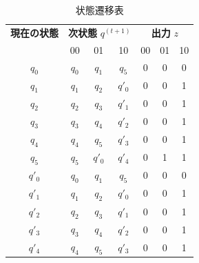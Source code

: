 \documentclass{article}
\begin{document}
\begin{table}[h]
\centering
\setlength{\tabcolsep}{6pt}
\renewcommand{\arraystretch}{1.2}
\begin{tabular}{c|ccc|ccc}
\toprule
\textbf{現在の状態} & \multicolumn{3}{c|}{\textbf{次状態 } $q^{(t+1)}$} & \multicolumn{3}{c}{\textbf{出力 } $z$} \\
 & 00 & 01 & 10 & 00 & 01 & 10 \\
\midrule
$q_0$ & $q_0$ & $q_1$ & $q_5$ & 0 & 0 & 0 \\
$q_1$ & $q_1$ & $q_2$ & $q'_0$ & 0 & 0 & 1 \\
$q_2$ & $q_2$ & $q_3$ & $q'_1$ & 0 & 0 & 1 \\
$q_3$ & $q_3$ & $q_4$ & $q'_2$ & 0 & 0 & 1 \\
$q_4$ & $q_4$ & $q_5$ & $q'_3$ & 0 & 0 & 1 \\
$q_5$ & $q_5$ & $q'_0$ & $q'_4$ & 0 & 1 & 1 \\
$q'_0$ & $q_0$ & $q_1$ & $q_5$ & 0 & 0 & 0 \\
$q'_1$ & $q_1$ & $q_2$ & $q'_0$ & 0 & 0 & 1 \\
$q'_2$ & $q_2$ & $q_3$ & $q'_1$ & 0 & 0 & 1 \\
$q'_3$ & $q_3$ & $q_4$ & $q'_2$ & 0 & 0 & 1 \\
$q'_4$ & $q_4$ & $q_5$ & $q'_3$ & 0 & 0 & 1 \\
\bottomrule
\end{tabular}
\caption{状態遷移表}
\end{table}
\end{document}
